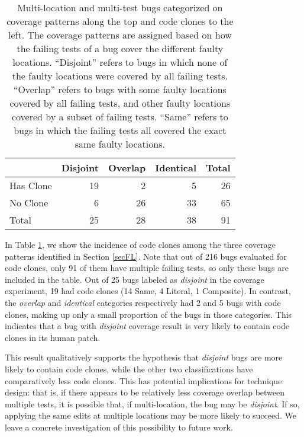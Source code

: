 \documentclass[sigconf, timestamp-false, anonymous=true]{acmart}
\begin{document}
\begin{table}
	{\begin{center}
			\begin{tabular} {lrrrr}
				\toprule
				& Disjoint & Overlap & Identical & Total \\
				\midrule
				Has Clone & 19 & 2 & 5 & 26 \\
				No Clone & 6 & 26 & 33 &  65\\
                \midrule
				Total & 25 & 28 & 38 & 91 \\
                \bottomrule
			\end{tabular}
		\end{center}
	}
	\caption{Multi-location and multi-test bugs categorized on coverage patterns along the top 
	and code clones to the left. The coverage patterns are assigned based on how the failing 
	tests of a bug cover the different faulty locations. ``Disjoint'' refers to bugs in which none 
	of the faulty 
	locations were covered by all 
	failing tests.  ``Overlap'' refers to bugs with some faulty locations covered by all failing 
	tests, and 
	other faulty locations covered by a subset of failing tests. ``Same'' refers to bugs in 
	which the 
	failing tests all covered the exact same faulty locations.}
	\label{tab:cov_clones}
\end{table}

In Table \ref{tab:cov_clones}, we show the incidence of code clones among the three 
coverage patterns identified in Section \ref{secFL}. Note that out of 216 bugs evaluated for code clones, only 91 of them have multiple failing tests, so only these bugs are included in the table.  Out of 25 bugs labeled as 
\emph{disjoint} in the coverage 
experiment, 19 had code clones (14 Same, 4 Literal, 1 Composite). In contrast, the 
\emph{overlap} and \emph{identical} categories respectively had 2 and 5 bugs with code clones, 
making up only a small proportion of the bugs in those categories. This indicates that a 
bug with \emph{disjoint} coverage result is very likely to contain code clones in its
human patch. 

This result qualitatively supports the hypothesis that \emph{disjoint} bugs are more likely to contain 
code clones, while the other two classifications have comparatively less code
clones. This has potential implications for technique design: that is, if there
appears to be relatively less coverage overlap between multiple tests, it is
possible that, if multi-location, the bug may be \emph{disjoint}.  If so,
applying the same edits at multiple locations may be more likely to succeed.  We
leave a concrete investigation of this possibility to future work.
\end{document}
